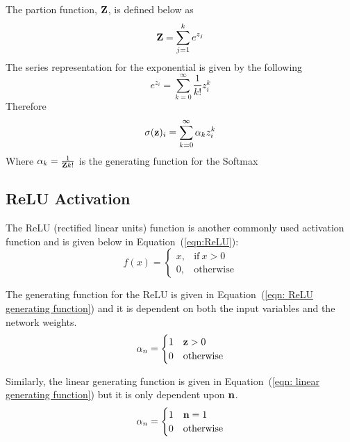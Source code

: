 The partion function, $\bold Z$, is defined below as
\begin{equation}
	\bold Z = \sum\limits_{j=1}^k e^{z_j}
\end{equation}
The series representation for the exponential is given by the following
\begin{equation}
	e^{z_{i}} = \sum_{k=0}^{\infty}\frac{1}{k!} z_{i}^{k}
\end{equation}
Therefore
\begin{equation}
	\sigma(\bold z)_i =
	\sum\limits_{k=0}^{\infty} \alpha_{k}z_{i}^{k}
\end{equation}
Where $\alpha_k = \frac{1}{{\bold Z}k!}$ is the generating function for the Softmax

\subsection{ReLU Activation}

The ReLU (rectified linear units) function is another commonly used activation function and is given below in Equation~(\ref{eqn:ReLU}):
\begin{equation}
	f(x) =
	\begin{cases}
		x, & \text{if}\ x > 0 \\
		0, & \text{otherwise}
	\end{cases}
	\label{eqn:ReLU}
\end{equation}

The generating function for the ReLU is given in Equation~(\ref{eqn: ReLU generating function}) and it is dependent on both the input variables and the network weights.
\begin{equation}
	\alpha_n =
		\begin{cases}
			1 & \bold z > 0 \\
			0 & \text{otherwise}
		\end{cases}
	\label{eqn: ReLU generating function}
\end{equation}

Similarly, the linear generating function is given in Equation~(\ref{eqn: linear generating function}) but it is only dependent upon $\bold n$.
\begin{equation}
	\alpha_n =
		\begin{cases}
			1 & \bold n = 1 \\
			0 & \text{otherwise}
		\end{cases}
	\label{eqn: linear generating function}
\end{equation}

